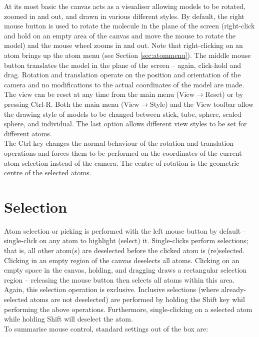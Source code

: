 At its most basic the canvas acts as a visualiser allowing models to be rotated, zoomed in and out, and drawn in various different styles. By default, the right mouse button is used to rotate the molecule in the plane of the screen (right-click and hold on an empty area of the canvas and move the mouse to rotate the model) and the mouse wheel zooms in and out. Note that right-clicking on an atom brings up the atom menu (see Section \ref{sec:atommenu}). The middle mouse button translates the model in the plane of the screen -- again, click-hold and drag. Rotation and translation operate on the position and orientation of the camera and no modifications to the actual coordinates of the model are made. The view can be reset at any time from the main menu (View$\rightarrow$Reset) or by pressing Ctrl-R. Both the main menu (View$\rightarrow$Style) and the View toolbar allow the drawing style of models to be changed between stick, tube, sphere, scaled sphere, and individual. The last option allows different view styles to be set for different atoms.\\

The Ctrl key changes the normal behaviour of the rotation and translation operations and forces them to be performed on the coordinates of the current atom selection instead of the camera. The centre of rotation is the geometric centre of the selected atoms.

\section{Selection}

Atom selection or picking is performed with the left mouse button by default -- single-click on any atom to highlight (select) it. Single-clicks perform  selections; that is, all other atom(s) are deselected before the clicked atom is (re)selected. Clicking in an empty region of the canvas deselects all atoms. Clicking on an empty space in the canvas, holding, and dragging draws a rectangular selection region -- releasing the mouse button then selects all atoms within this area. Again, this selection operation is exclusive. Inclusive selections (where already-selected atoms are not deselected) are performed by holding the Shift key whil performing the above operations. Furthermore, single-clicking on a selected atom while holding Shift will deselect the atom.\\


To summarise mouse control, standard settings out of the box are:\\

